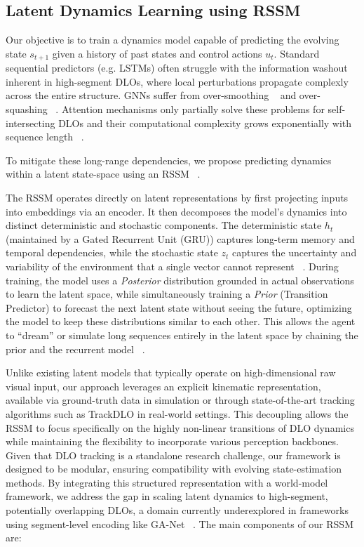 \documentclass[letterpaper, 10 pt, conference]{ieeeconf}  %
\begin{document}
\subsection{Latent Dynamics Learning using RSSM}

Our objective is to train a dynamics model capable of predicting the evolving state $s_{t+1}$ given a history of past states and control actions $u_t$. Standard sequential predictors (e.g. LSTMs) often struggle with the information washout inherent in high-segment DLOs, where local perturbations propagate complexly across the entire structure. GNNs suffer from over-smoothing ~\cite{oono_graph_2021} and over-squashing ~\cite{giovanni_how_2024, alon_bottleneck_2021}. Attention mechanisms only partially solve these problems for self-intersecting DLOs and their computational complexity grows exponentially with sequence length ~\cite{patro_mamba-360_2024}.

To mitigate these long-range dependencies, we propose predicting dynamics within a latent state-space using an RSSM ~\cite{hafner_learning_2019}.

The RSSM operates directly on latent representations by first projecting inputs into embeddings via an encoder. It then decomposes the model's dynamics into distinct deterministic and stochastic components. The deterministic state $h_t$ (maintained by a Gated Recurrent Unit (GRU)) captures long-term memory and temporal dependencies, while the stochastic state $z_t$ captures the uncertainty and variability of the environment that a single vector cannot represent ~\cite{hafner_learning_2019}. During training, the model uses a \textit{Posterior} distribution grounded in actual observations to learn the latent space, while simultaneously training a \textit{Prior} (Transition Predictor) to forecast the next latent state without seeing the future, optimizing the model to keep these distributions similar to each other. This allows the agent to ``dream'' or simulate long sequences entirely in the latent space by chaining the prior and the recurrent model ~\cite{hafner_dream_2020}.

Unlike existing latent models that typically operate on high-dimensional raw visual input, our approach leverages an explicit kinematic representation, available via ground-truth data in simulation or through state-of-the-art tracking algorithms such as TrackDLO \cite{xiang_trackdlo_2023} in real-world settings. This decoupling allows the RSSM to focus specifically on the highly non-linear transitions of DLO dynamics while maintaining the flexibility to incorporate various perception backbones. Given that DLO tracking is a standalone research challenge, our framework is designed to be modular, ensuring compatibility with evolving state-estimation methods. By integrating this structured representation with a world-model framework, we address the gap in scaling latent dynamics to high-segment, potentially overlapping DLOs, a domain currently underexplored in frameworks using segment-level encoding like GA-Net ~\cite{gu_learning_2025}. 
The main components of our RSSM are:
\end{document}
